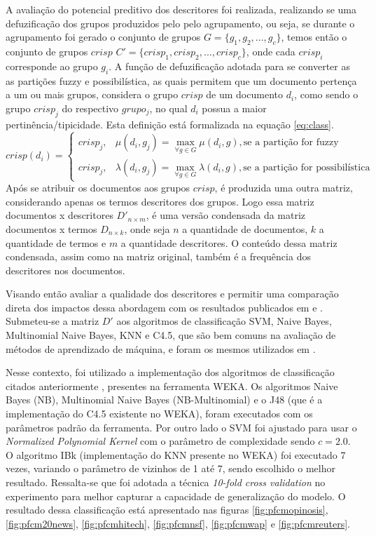A avaliação do potencial preditivo dos descritores foi realizada, realizando se uma defuzificação
dos grupos produzidos pelo pelo agrupamento, ou seja, se durante o agrupamento foi gerado o conjunto
de grupos $G = \{g_1,g_2,...,g_c\}$, temos então o conjunto de grupos $crisp$ $C' =
\{crisp_1,crisp_2,...,crisp_c\}$, onde cada $crisp_i$ corresponde ao grupo $g_i$. A função de
defuzificação adotada para se converter as
as partições fuzzy e possibilística, as quais permitem que um documento pertença a um ou mais
grupos, considera o grupo $crisp$ de um documento $d_i$, como sendo o grupo $crisp_j$ do respectivo
$grupo_j$, no qual $d_i$ possua a maior
pertinência/tipicidade. Esta definição está formalizada na equação \ref{eq:class}.
\begin{equation}
  crisp(d_i) = \begin{cases}
    crisp_j, & \mu(d_i,g_j) = \displaystyle\max_{\forall g \in G} \mu(d_i,g), \text{se a partição
  for fuzzy}\\
  crisp_j, & \lambda(d_i,g_j) = \displaystyle\max_{\forall g \in G} \lambda(d_i,g), \text{se a
  partição for possibilística}
  \end{cases}
  \label{eq:class}
\end{equation}
Após se atribuir os documentos aos grupos $crisp$, é produzida uma outra matriz,
considerando apenas os termos descritores dos grupos. Logo essa matriz documentos x descritores
$D'_{n \times m}$, 
é uma versão condensada da matriz documentos x termos $D_{n \times k}$, onde seja $n$ a 
quantidade de documentos, $k$ a quantidade de termos e $m$ a quantidade descritores. O conteúdo
dessa matriz condensada, assim como na matriz original, também é a frequência dos descritores nos 
documentos. 

Visando então avaliar a qualidade dos descritores e permitir uma comparação direta dos impactos
dessa abordagem com os resultados publicados em  e
. Submeteu-se a matriz $D'$ 
aos algoritmos de classificação 
SVM, Naive Bayes, Multinomial Naive Bayes, KNN e C4.5, que são bem comuns na avaliação de 
métodos de aprendizado de máquina, e foram os mesmos utilizados em .

Nesse contexto, foi utilizado a implementação dos algoritmos de classificação citados anteriormente
, presentes na ferramenta WEKA\cite{weka}. Os algoritmos Naive Bayes (NB), Multinomial Naive Bayes
(NB-Multinomial) e o J48 (que é a implementação do C4.5 existente no WEKA), foram executados com os
parâmetros padrão da ferramenta. Por outro lado o SVM foi ajustado para usar o {\it Normalized
Polynomial Kernel\/} com o parâmetro de complexidade sendo $c = 2.0$. O algoritmo IBk (implementação
do KNN presente no WEKA) foi executado 7 vezes, variando o parâmetro de vizinhos de 1 até 7, sendo
escolhido o melhor resultado. Ressalta-se que foi adotada a técnica {\it 10-fold cross validation\/}
no experimento para melhor capturar a capacidade de generalização do modelo. O resultado dessa
classificação está apresentado nas figuras \ref{fig:pfcmopinosis},  \ref{fig:pfcm20news},
\ref{fig:pfcmhitech}, \ref{fig:pfcmnsf}, \ref{fig:pfcmwap} e \ref{fig:pfcmreuters}. 

